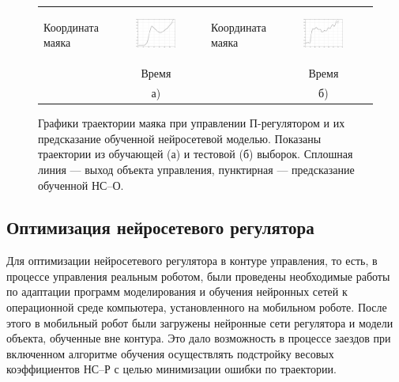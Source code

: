 \begin{figure}
\centering
\begin{tabular}{lclc}
  \begin{sideways}
    {\hspace{1.7cm}\small Координата маяка}
  \end{sideways}
  &
  \includegraphics[width=0.45\textwidth,%
    totalheight=0.25\textheight]{moby_nnp_learn_no_title}
  &
  \begin{sideways}
    {\hspace{1.7cm}\small Координата маяка}
  \end{sideways}
  &
  \includegraphics[width=0.45\textwidth,%
    totalheight=0.25\textheight]{moby_nnp_test_no_title}
  \\
  & {\small Время} & & {\small Время}\\
  & а) & & б)\\
\end{tabular}
\caption{Графики траектории маяка при управлении П-регулятором и их
предсказание обученной нейросетевой моделью.  Показаны траектории
из обучающей (а) и тестовой (б) выборок.  Сплошная линия --- выход объекта
управления, пунктирная --- предсказание обученной НС--О.}
\label{fig:moby_nnp}
\end{figure}

\subsection{Оптимизация нейросетевого регулятора}

Для оптимизации нейросетевого регулятора в контуре управления, то
есть, в процессе управления реальным роботом, были проведены
необходимые работы по адаптации программ моделирования и обучения
нейронных сетей к операционной среде компьютера, установленного на
мобильном роботе.  После этого в мобильный робот были загружены
нейронные сети регулятора и модели объекта, обученные вне контура.
Это дало возможность в процессе заездов при включенном алгоритме
обучения осуществлять подстройку весовых коэффициентов НС--Р с целью
минимизации ошибки по траектории.

